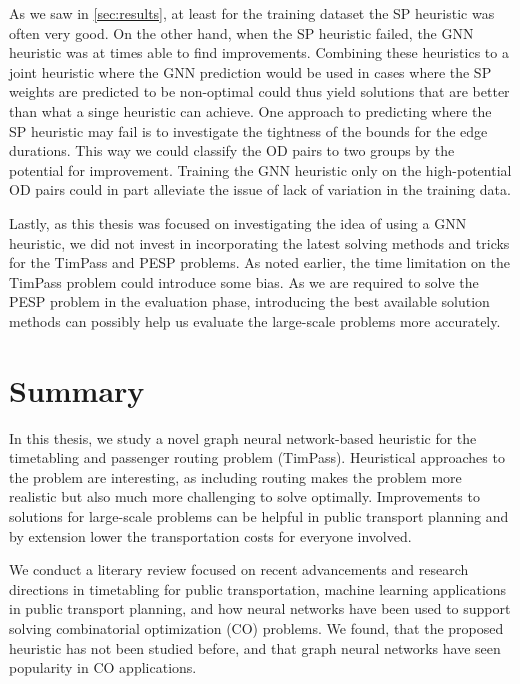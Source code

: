 \documentclass[english, 12pt, a4paper, sci, utf8, a-2b, online]{aaltothesis}
\begin{document}
As we saw in \cref{sec:results}, at least for the training dataset the SP heuristic was often very good. On the other hand, when the SP heuristic failed, the GNN heuristic was at times able to find improvements. Combining these heuristics to a joint heuristic where the GNN prediction would be used in cases where the SP weights are predicted to be non-optimal could thus yield solutions that are better than what a singe heuristic can achieve. One approach to predicting where the SP heuristic may fail is to investigate the tightness of the bounds for the edge durations. This way we could classify the OD pairs to two groups by the potential for improvement. Training the GNN heuristic only on the high-potential OD pairs could in part alleviate the issue of lack of variation in the training data.

Lastly, as this thesis was focused on investigating the idea of using a GNN heuristic, we did not invest in incorporating the latest solving methods and tricks for the TimPass and PESP problems. As noted earlier, the time limitation on the TimPass problem could introduce some bias. As we are required to solve the PESP problem in the evaluation phase, introducing the best available solution methods can possibly help us evaluate the large-scale problems more accurately.



\clearpage
\section{Summary}
\label{sec:summary}

In this thesis, we study a novel graph neural network-based heuristic for the timetabling and passenger routing problem (TimPass). Heuristical approaches to the problem are interesting, as including routing makes the problem more realistic but also much more challenging to solve optimally. Improvements to solutions for large-scale problems can be helpful in public transport planning and by extension lower the transportation costs for everyone involved.

We conduct a literary review focused on recent advancements and research directions in timetabling for public transportation, machine learning applications in public transport planning, and how neural networks have been used to support solving combinatorial optimization (CO) problems. We found, that the proposed heuristic has not been studied before, and that graph neural networks have seen popularity in CO applications.
\end{document}
